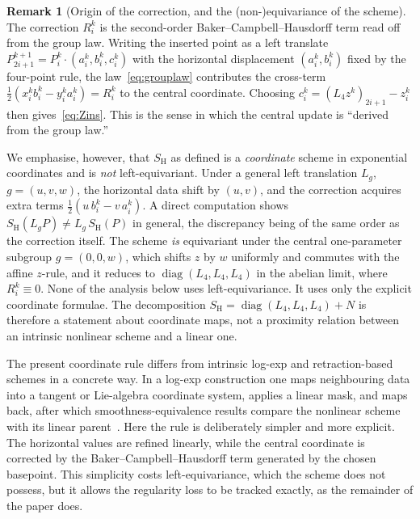 \documentclass{article}
\theoremstyle{plain}
\theoremstyle{definition}
\newtheorem{remark}[theorem]{Remark}
\newcommand{\SH}{S_{\mathrm{H}}}
\newcommand{\Lop}{L_4}
\DeclareMathOperator{\diag}{diag}
\begin{document}
\begin{remark}[Origin of the correction, and the (non-)equivariance of the scheme]\label{rem:groupcompat}
The correction $R_i^k$ is the second-order Baker--Campbell--Hausdorff term read
off from the group law. Writing the inserted point as a left translate
$P_{2i+1}^{k+1}=P_i^k\cdot(a_i^k,b_i^k,c_i^k)$ with the horizontal displacement
$(a_i^k,b_i^k)$ fixed by the four-point rule, the law~\eqref{eq:grouplaw}
contributes the cross-term $\tfrac12(x_i^k b_i^k-y_i^k a_i^k)=R_i^k$ to the
central coordinate. Choosing $c_i^k=(\Lop z^k)_{2i+1}-z_i^k$ then
gives~\eqref{eq:Zins}. This is the sense in which the central update is
``derived from the group law.''

We emphasise, however, that $\SH$ as defined is a \emph{coordinate} scheme in
exponential coordinates and is \emph{not} left-equivariant. Under a general left
translation $L_g$, $g=(u,v,w)$, the horizontal data shift by $(u,v)$, and the
correction acquires extra terms $\tfrac12(u\,b_i^k-v\,a_i^k)$. A direct
computation shows $\SH(L_g P)\neq L_g\,\SH(P)$ in general, the discrepancy being
of the same order as the correction itself. The scheme \emph{is} equivariant
under the central one-parameter subgroup $g=(0,0,w)$, which shifts $z$ by $w$
uniformly and commutes with the affine $z$-rule, and it reduces to
$\diag(\Lop,\Lop,\Lop)$ in the abelian limit, where $R_i^k\equiv0$. None of the
analysis below uses left-equivariance. It uses only the explicit coordinate
formulae. The decomposition $\SH=\diag(\Lop,\Lop,\Lop)+N$ is therefore a
statement about coordinate maps, not a proximity relation between an intrinsic
nonlinear scheme and a linear one.
\end{remark}

The present coordinate rule differs from intrinsic log-exp and retraction-based
schemes in a concrete way. In a log-exp construction one maps neighbouring data
into a tangent or Lie-algebra coordinate system, applies a linear mask, and maps
back, after which smoothness-equivalence results compare the nonlinear scheme
with its linear parent~\cite{WallnerNYGrohs07, XieYu10, DuchampXieYu13,
NavYazYu11}. Here the rule is deliberately simpler and more explicit. The
horizontal values are refined linearly, while the central coordinate is
corrected by the Baker--Campbell--Hausdorff term generated by the chosen
basepoint. This simplicity costs left-equivariance, which the scheme does not
possess, but it allows the regularity loss to be tracked exactly, as the
remainder of the paper does.
\end{document}
